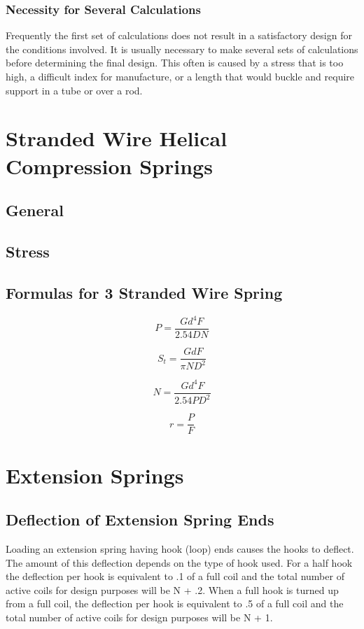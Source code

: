 \documentclass[10pt]{article}
\begin{document}
\subsubsection{Necessity for Several Calculations}
Frequently the first set of calculations does not result in a satisfactory design for the conditions involved. 
It is usually necessary to make several sets of calculations before determining the final design. 
This often is caused by a stress that is too high, a difficult index for manufacture, or a length that would buckle and require support in a tube or over a rod.

\section{Stranded Wire Helical Compression Springs}
\subsection{General}
\subsection{Stress}
\subsection{Formulas for 3 Stranded Wire Spring}

$$ P = \frac{G d^4 F}{2.54 D N} $$

$$ S_t = \frac{G d F}{\pi N D^2} $$

$$ N = \frac{G d^4 F}{2.54 P D^2} $$

$$ r = \frac{P}{F} $$

\setcounter{section}{21} %
\section{Extension Springs}  %
\subsection{Deflection of Extension Spring Ends} %
Loading an extension spring having hook (loop) ends causes the hooks to deflect.
The amount of this deflection depends on the type of hook used. 
For a half hook the deflection per hook is equivalent to .1 of a full coil and the total number of active coils for design purposes will be N + .2.
When a full hook is turned up from a full coil, the deflection per hook is equivalent to .5 of a full coil and the total number of active coils for design purposes will be N + 1.
\end{document}
